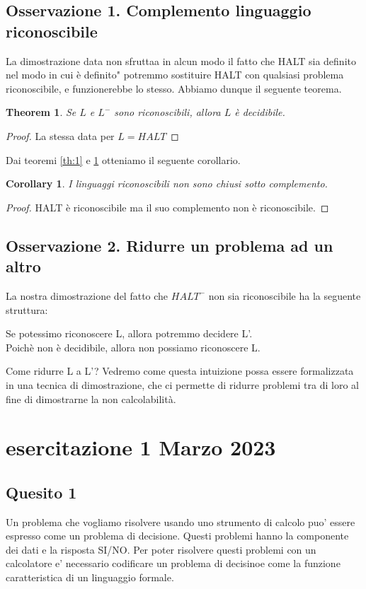 \documentclass[a4paper, 12pt]{article}
\newtheorem{theorem}{Theorem}[section]
\newtheorem{corollary}{Corollary}[theorem]
\begin{document}
\subsection{Osservazione 1. Complemento linguaggio riconoscibile}
La dimostrazione data non sfruttaa in alcun modo il fatto che HALT sia definito nel modo in cui \`e definito" potremmo sostituire HALT con qualsiasi problema riconoscibile, e funzionerebbe lo stesso. Abbiamo dunque il seguente teorema.
\begin{theorem}
\label{th:2}
Se $L$ e $L^{-}$ sono riconoscibili, allora $L$ \`e decidibile.
\end{theorem}
\begin{proof}
La stessa data per $L = HALT$
\end{proof}
Dai teoremi \ref{th:1} e \ref{th:2} otteniamo il seguente corollario.
\begin{corollary}
I linguaggi riconoscibili non sono chiusi sotto complemento.
\end{corollary}
\begin{proof}
HALT \`e riconoscibile ma il suo complemento non \`e riconoscibile.
\end{proof}
\subsection{Osservazione 2. Ridurre un problema ad un altro}
La nostra dimostrazione del fatto che $HALT^{-}$ non sia riconoscibile ha la seguente struttura:
\begin{center}
Se potessimo riconoscere L, allora potremmo decidere L'.\\ Poich\`e non \`e decidibile, allora non possiamo riconoscere L.
\end{center}
Come ridurre L a L'? Vedremo come questa intuizione possa essere formalizzata in una tecnica di dimostrazione, che ci permette di ridurre problemi tra di loro al fine di dimostrarne la non calcolabilit\`a.
\section{esercitazione 1 Marzo 2023}
\subsection{Quesito 1}
Un problema che vogliamo risolvere usando uno strumento di calcolo puo' essere espresso come un problema di decisione. Questi problemi hanno la componente dei dati e la risposta SI/NO. Per poter risolvere questi problemi con un calcolatore e' necessario codificare un problema di decisinoe come la funzione caratteristica di un linguaggio formale.
\end{document}

